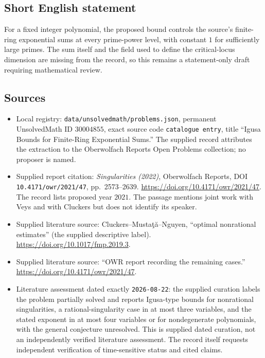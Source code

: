 \documentclass[11pt]{article}
\begin{document}
\subsection{Short English statement}
For a fixed integer polynomial, the proposed bound controls the source's finite-ring exponential sums at every prime-power level, with constant \(1\) for sufficiently large primes. The sum itself and the field used to define the critical-locus dimension are missing from the record, so this remains a statement-only draft requiring mathematical review.
\subsection{Sources}
\begin{itemize}
\item Local registry: \texttt{data/unsolvedmath/problems.json}, permanent UnsolvedMath ID \(30004855\), exact source code \texttt{catalogue entry}, title ``Igusa Bounds for Finite-Ring Exponential Sums.'' The supplied record attributes the extraction to the Oberwolfach Reports Open Problems collection; no proposer is named.
\item Supplied report citation: \emph{Singularities (2022)}, Oberwolfach Reports, DOI \texttt{10.4171/owr/2021/47}, pp.\ 2573--2639. \url{https://doi.org/10.4171/owr/2021/47}. The record lists proposed year \(2021\). The passage mentions joint work with Veys and with Cluckers but does not identify its speaker.
\item Supplied literature source: Cluckers--Mustaţă--Nguyen, ``optimal nonrational estimates'' (the supplied descriptive label). \url{https://doi.org/10.1017/fmp.2019.3}.
\item Supplied literature source: ``OWR report recording the remaining cases.'' \url{https://doi.org/10.4171/owr/2021/47}.
\item Literature assessment dated exactly \texttt{2026-08-22}: the supplied curation labels the problem partially solved and reports Igusa-type bounds for nonrational singularities, a rational-singularity case in at most three variables, and the stated exponent in at most four variables or for nondegenerate polynomials, with the general conjecture unresolved. This is supplied dated curation, not an independently verified literature assessment. The record itself requests independent verification of time-sensitive status and cited claims.
\end{itemize}
\end{document}
